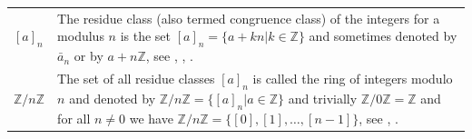 \documentclass[12pt]{amsart}
\theoremstyle{definition}
\begin{document}
{\begin{table}[H]
\begin{tabular}{|P{1.4cm} p{13.4cm}|}
		\\
		$[a]_n$ & The residue class (also termed congruence class) of the integers for a modulus $n$ is the set $[a]_n=\{a+kn|k\in\mathbb{Z}\}$ and sometimes denoted by $\bar a_n$ or by $a+n\mathbb{Z}$, see \cite[p.~15]{Ref_Wolfart_2011}, \cite[p.~122]{Ref_Schubert_2012}, \cite[p.~25]{Ref_Mueller-Stach_2011}.
		\\
		$\mathbb{Z}/n\mathbb{Z}$ & The set of all residue classes $[a]_n$ is called the ring of integers modulo $n$ and denoted by $\mathbb{Z}/n\mathbb{Z}=\{[a]_n|a\in\mathbb{Z}\}$ and trivially $\mathbb{Z}/0\mathbb{Z}=\mathbb{Z}$ and for all $n\ne0$ we have $\mathbb{Z}/n\mathbb{Z}=\{[0],[1],\ldots,[n-1]\}$, see \cite[p.~15]{Ref_Wolfart_2011}, \cite[p.~25]{Ref_Mueller-Stach_2011}. 
		\\ \hline
	\end{tabular}
\end{table}}
\end{document}
